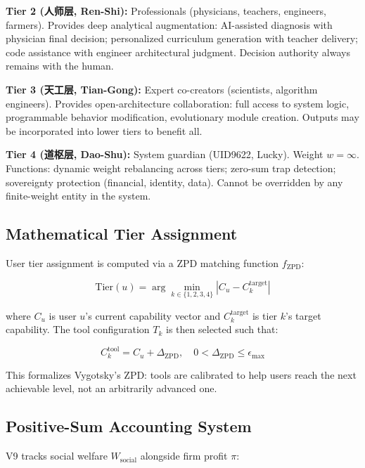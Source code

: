 \documentclass[conference]{IEEEtran}
\begin{document}
\textbf{Tier 2 (人师层, Ren-Shi):}
Professionals (physicians, teachers, engineers, farmers).
Provides deep analytical augmentation: AI-assisted
diagnosis with physician final decision; personalized
curriculum generation with teacher delivery; code
assistance with engineer architectural judgment.
Decision authority always remains with the human.

\textbf{Tier 3 (天工层, Tian-Gong):}
Expert co-creators (scientists, algorithm engineers).
Provides open-architecture collaboration: full access
to system logic, programmable behavior modification,
evolutionary module creation. Outputs may be
incorporated into lower tiers to benefit all.

\textbf{Tier 4 (道枢层, Dao-Shu):}
System guardian (UID9622, Lucky). Weight $w = \infty$.
Functions: dynamic weight rebalancing across tiers;
zero-sum trap detection; sovereignty protection
(financial, identity, data). Cannot be overridden
by any finite-weight entity in the system.

\subsection{Mathematical Tier Assignment}

User tier assignment is computed via a ZPD matching
function $f_{\text{ZPD}}$:

\begin{equation}
  \text{Tier}(u) = \arg\min_{k \in \{1,2,3,4\}}
  \left| C_u - C_k^{\text{target}} \right|
  \label{eq:tier}
\end{equation}

where $C_u$ is user $u$'s current capability vector
and $C_k^{\text{target}}$ is tier $k$'s target capability.
The tool configuration $T_k$ is then selected such that:

\begin{equation}
  C_k^{\text{tool}} = C_u + \Delta_{\text{ZPD}},
  \quad 0 < \Delta_{\text{ZPD}} \leq \epsilon_{\text{max}}
  \label{eq:zpd}
\end{equation}

This formalizes Vygotsky's ZPD: tools are calibrated
to help users reach the next achievable level, not an
arbitrarily advanced one.

\subsection{Positive-Sum Accounting System}

V9 tracks social welfare $W_{\text{social}}$ alongside
firm profit $\pi$:
\end{document}

